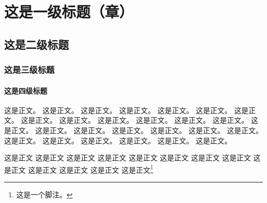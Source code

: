 \documentclass{scipub}
\begin{document}
\frontmatter
\tableofcontents

\newpage
\mainmatter
\chapter{这是一级标题（章）}
\section{这是二级标题}
\subsection{这是三级标题}
\subsubsection{这是四级标题}
这是正文。 这是正文。 这是正文。 这是正文。 这是正文。 这是正文。 这是正文。 这是正文。 这是正文。 这是正文。 这是正文。 这是正文。 这是正文。
这是正文。 这是正文。 这是正文。 这是正文。 这是正文。 这是正文。 这是正文。 这是正文。 这是正文。 这是正文。 这是正文。 这是正文。 这是正文。

这是正文 这是正文 这是正文 这是正文 这是正文 这是正文 这是正文 这是正文 这是正文 这是正文 这是正文 这是正文 这是正文\footnote{这是一个脚注。}
\end{document}
